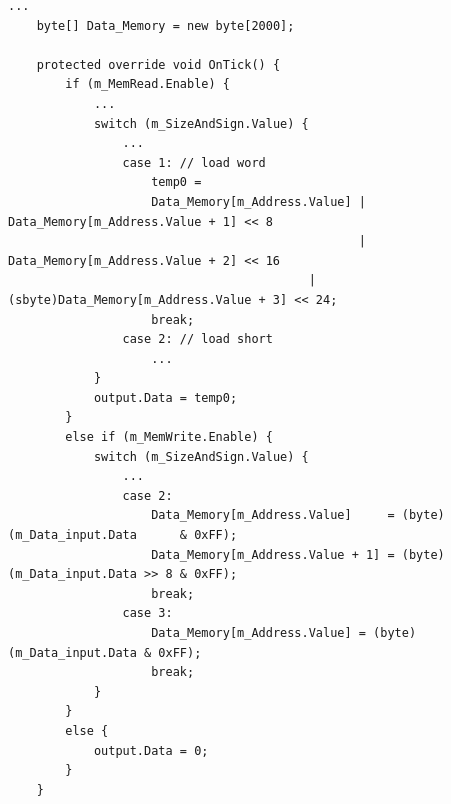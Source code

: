         \begin{minipage}{\linewidth}
            \begin{lstlisting}[language={[Sharp]C}, caption={A slice of the \texttt{Data Memory} process SME code. Similar to the instruction memory, the data memory consists of a byte array, which we made 2000 elements long in this case. As there can only be read or written to the data memory once per clock cycle, we simply construct an \texttt{if/else} statement, which uses control signals to determine the procedure to be done. Both the read and write procedures need to know the size and sign of the data to be loaded or written. Therefore a \texttt{switch} statement has been added to both outcomes, which uses \texttt{SizeAndSign} control signal to choose between the cases. When reading the data from memory we need to remember that it is little-endian addressed  so before we output the value the bits need to be shuffled around in the correct order, so the correct value is added to the register, as that is big-endian. When writing the data the opposite need to happen, so a big-endian value need to be converted to a little-endian one. If both read and write control signals are deasserted I choose to output 0.},captionpos=b, label = DM]
...
    byte[] Data_Memory = new byte[2000];
            
    protected override void OnTick() {
        if (m_MemRead.Enable) {
            ...
            switch (m_SizeAndSign.Value) {
                ...
                case 1: // load word
                    temp0 =
                    Data_Memory[m_Address.Value] | Data_Memory[m_Address.Value + 1] << 8
                                                 | Data_Memory[m_Address.Value + 2] << 16
                                          | (sbyte)Data_Memory[m_Address.Value + 3] << 24;
                    break;
                case 2: // load short
                    ...
            }
            output.Data = temp0;
        }
        else if (m_MemWrite.Enable) {
            switch (m_SizeAndSign.Value) {
                ...
                case 2:
                    Data_Memory[m_Address.Value]     = (byte)(m_Data_input.Data      & 0xFF);
                    Data_Memory[m_Address.Value + 1] = (byte)(m_Data_input.Data >> 8 & 0xFF);
                    break;
                case 3:
                    Data_Memory[m_Address.Value] = (byte)(m_Data_input.Data & 0xFF); 
                    break;
            }
        }
        else {
            output.Data = 0;
        }
    }
            \end{lstlisting}
        \end{minipage} 
    
